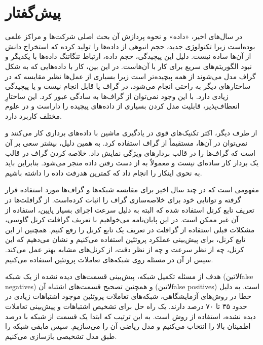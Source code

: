 \chapter*{پیش‌گفتار}

در سال‌های اخیر، «داده» و نحوه پردازش آن بحث اصلی شرکت‌ها و مراکز علمی بوده‌است زیرا تکنولوژی جدید، حجم انبوهی از داده‌ها را تولید کرده که استخراج دانش از آن‌ها سا‌ده نیست. دلیل این پیچیدگی، حجم داده، ارتباط تنگاتنگ داده‌ها با یکدیگر و نبود الگوریتم‌های سریع برای کار با آن‌هاست. در این بین، کار با داده‌هایی که به شکل گراف مدل می‌شوند از همه پیچیده‌تر است زیرا بسیاری از عمل‌ها نظیر مقایسه که در ساختار‌های دیگر به راحتی انجام می‌شود، در گراف یا قابل انجام نیست و یا پیچیدگی زیادی دارد. با این وجود نمی‌توان از گراف‌ها به سادگی عبور کرد. این ساختارِ انعطاف‌پذیر، قابلیت مدل کردن بسیاری از داده‌های پیچیده را داراست و در علوم مختلف کاربرد دارد.

از طرف دیگر، اکثر تکنیک‌های قوی در یادگیری ماشین با داده‌های برداری کار می‌کنند و نمی‌توان در آن‌ها، مستقیماً از گراف‌ استفاده کرد. به همین دلیل، بیشتر سعی بر آن است که گراف‌ها را در قالب بردارهای ویژگی نمایش داد. خلاصه کردن گراف در قالب یک بردار کار ساده‌ای نیست و معمولاً به از دست رفتن داده منجر می‌شود. بنابراین باید به نحوی اینکار را انجام داد که کمترین هدرفت داده را داشته باشیم.

 مفهومی است که در چند سال اخیر برای مقایسه شبکه‌ها و گراف‌ها مورد استفاده قرار گرفته و توانایی خود برای خلاصه‌سازی گراف را اثبات کرده‌است. از گرافلت‌ها در تعریف تابع کرنل استفاده شده که البته به دلیل سرعت اجرای بسیار پایین، استفاده از آن غیر ممکن است. در این پایان‌نامه می‌خواهیم با تعریف گرافلت کرنل گاوسی، مشکلات قبلی استفاده از گرافلت در تعریف یک تابع کرنل را رفع کنیم. همچنین از این تابع کرنل، برای پیش‌بینی عملکرد پروتئین استفاده می‌کنیم و نشان می‌دهیم که این کرنل، چه از نظر سرعت و چه از نظر دقت، از کرنل‌های مشابه بهتر عمل می‌کند. سپس از آن در مسئله  روی شبکه‌های تعاملات پروتئین استفاده می‌کنیم.

هدف از مسئله تکمیل شبکه، پیش‌بینی قسمت‌های دیده نشده از یک شبکه (‌لاتین{false negatives}) و همچنین تصحیح قسمت‌های اشتباه آن (‌لاتین{false positives}) است. به دلیل خطا در روش‌های آزمایشگاهی، شبکه‌های تعاملات پروتئین موجود اشتباهات زیادی در حدود ۳۵ تا ۷۰ درصد دارند. یک راه حل برای تشخیص اشتباهات و پیش‌بینی تعاملات دیده نشده، استفاده از روش  است. به این ترتیب که ابتدا یک قسمت از شبکه با درصد اطمینان بالا را انتخاب می‌کنیم و مدل ریاضی آن را می‌سازیم. سپس مابقی شبکه را طبق مدل تشخیصی بازسازی می‌کنیم.